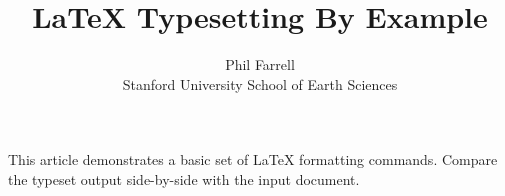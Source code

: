 \documentclass[11pt]{article}
\begin{document}
\title{LaTeX Typesetting By Example}
\author{Phil Farrell\\
Stanford University School of Earth Sciences}
\maketitle
This article demonstrates a basic set of LaTeX formatting commands.
Compare the typeset output side-by-side with the input document.
\end{document}
